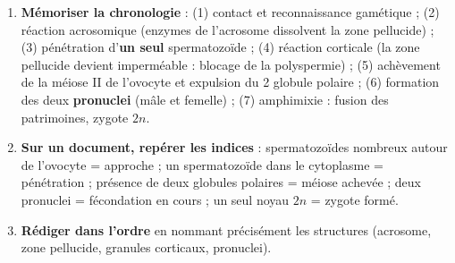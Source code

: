 \documentclass[11pt]{article}
\newcommand{\cle}[1]{{\popxbold\color{popdark}#1}}
\begin{document}
\begin{methode}
\begin{enumerate}
\item \textbf{Mémoriser la chronologie} : (1) contact et reconnaissance gamétique ; (2) \cle{réaction acrosomique} (enzymes de l'acrosome dissolvent la zone pellucide) ; (3) pénétration d'\textbf{un seul} spermatozoïde ; (4) \cle{réaction corticale} (la zone pellucide devient imperméable : blocage de la polyspermie) ; (5) achèvement de la méiose II de l'ovocyte et expulsion du 2 globule polaire ; (6) formation des deux \textbf{pronuclei} (mâle et femelle) ; (7) \cle{amphimixie} : fusion des patrimoines, zygote $2n$.
\item \textbf{Sur un document, repérer les indices} : spermatozoïdes nombreux autour de l'ovocyte = approche ; un spermatozoïde dans le cytoplasme = pénétration ; présence de deux globules polaires = méiose achevée ; deux pronuclei = fécondation en cours ; un seul noyau $2n$ = zygote formé.
\item \textbf{Rédiger dans l'ordre} en nommant précisément les structures (acrosome, zone pellucide, granules corticaux, pronuclei).
\end{enumerate}
\end{methode}
\end{document}
